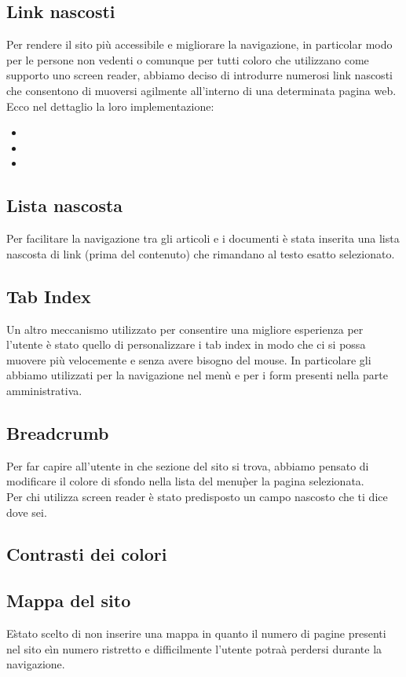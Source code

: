 \subsection{Link nascosti}
Per rendere il sito pi\`u accessibile e migliorare la navigazione, in particolar modo per le persone non vedenti o comunque per tutti coloro che utilizzano come supporto uno screen reader, abbiamo deciso di introdurre numerosi link nascosti che consentono di muoversi agilmente all'interno di una determinata pagina web. \\
Ecco nel dettaglio la loro implementazione:
	\begin{itemize}
		\item
		\item
		\item
	\end{itemize}
\subsection{Lista nascosta}
Per facilitare la navigazione tra gli articoli e i documenti è stata inserita una lista nascosta di link (prima del contenuto) che rimandano al testo esatto selezionato.

\subsection{Tab Index}
Un altro meccanismo utilizzato per consentire una migliore esperienza per l'utente \`e stato quello di personalizzare i tab index in modo che ci si possa muovere pi\`u velocemente e senza avere bisogno del mouse.
In particolare gli abbiamo utilizzati per la navigazione nel men\`u e per i form presenti nella parte amministrativa.

\subsection{Breadcrumb}
Per far capire all'utente in che sezione del sito si trova, abbiamo pensato di modificare il colore di sfondo nella lista del menu\`per la pagina selezionata. \\  Per chi utilizza screen reader è stato predisposto un campo nascosto che ti dice dove sei.

\subsection{Contrasti dei colori}

\subsection{Mappa del sito}
E\` stato scelto di non inserire una mappa in quanto il numero di pagine presenti nel sito e\` in numero ristretto e difficilmente l'utente potra\`a perdersi durante la navigazione.